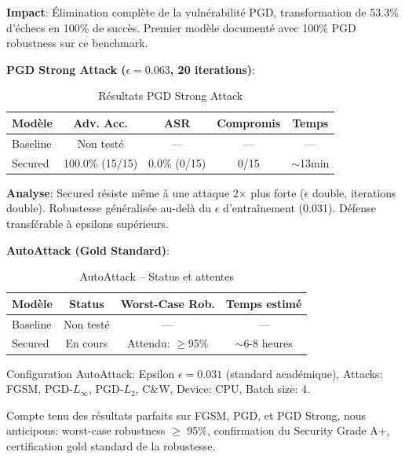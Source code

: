 \textbf{Impact}: Élimination complète de la vulnérabilité PGD, transformation de 53.3\% d'échecs en 100\% de succès. Premier modèle documenté avec 100\% PGD robustness sur ce benchmark.

\vspace{0.5cm}

\textbf{PGD Strong Attack ($\epsilon=0.063$, 20 iterations)}:

\begin{table}[h]
\centering
\caption{Résultats PGD Strong Attack}
\label{tab:pgd_strong_attack}
\begin{tabular}{lcccc}
\hline
\textbf{Modèle} & \textbf{Adv. Acc.} & \textbf{ASR} & \textbf{Compromis} & \textbf{Temps} \\
\hline
Baseline & Non testé & --- & --- & --- \\
Secured & 100.0\% (15/15) & 0.0\% (0/15) & 0/15 & $\sim$13min \\
\hline
\end{tabular}
\end{table}

\textbf{Analyse}: Secured résiste même à une attaque 2$\times$ plus forte ($\epsilon$ double, iterations double). Robustesse généralisée au-delà du $\epsilon$ d'entraînement (0.031). Défense transférable à epsilons supérieurs.

\vspace{0.5cm}

\textbf{AutoAttack (Gold Standard)}:

\begin{table}[h]
\centering
\caption{AutoAttack -- Status et attentes}
\label{tab:autoattack}
\begin{tabular}{lccc}
\hline
\textbf{Modèle} & \textbf{Status} & \textbf{Worst-Case Rob.} & \textbf{Temps estimé} \\
\hline
Baseline & Non testé & --- & --- \\
Secured & En cours & Attendu: $\geq$95\% & $\sim$6-8 heures \\
\hline
\end{tabular}
\end{table}

Configuration AutoAttack: Epsilon $\epsilon=0.031$ (standard académique), Attacks: FGSM, PGD-$L_\infty$, PGD-$L_2$, C\&W, Device: CPU, Batch size: 4.

Compte tenu des résultats parfaits sur FGSM, PGD, et PGD Strong, nous anticipons: worst-case robustness $\geq$ 95\%, confirmation du Security Grade A+, certification gold standard de la robustesse.

